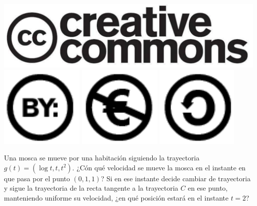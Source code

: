 \documentclass[aspectratio=149,10pt,xcolor=dvipsnames,t]{beamer}
\begin{document}
\begin{frame}[c]
\begin{center}
\biskip
\includegraphics[scale=0.07]{img/cc-logo}
\includegraphics[scale=0.2]{img/cc-by}
\includegraphics[scale=0.2]{img/cc-e}
\includegraphics[scale=0.2]{img/cc-c}
\end{center}
\end{frame}

\begin{frame}[c]
Una mosca se mueve por una habitación siguiendo la trayectoria $g(t)=(\log t, t, t^2)$. ¿Cón qué
velocidad se mueve la mosca en el instante en que pasa por el punto $(0,1,1)$? Si en ese instante decide cambiar de
trayectoria y sigue la trayectoria de la recta tangente a la trayectoria $C$ en ese punto, manteniendo uniforme su
velocidad, ¿en qué posición estará en el instante $t=2$?
\end{frame}
\end{document}
